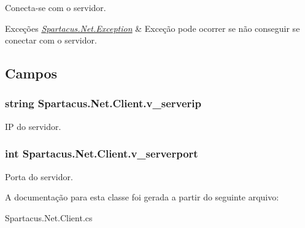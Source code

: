 Conecta-\/se com o servidor. 


\begin{DoxyExceptions}{Exceções}
{\em \hyperlink{classSpartacus_1_1Net_1_1Exception}{Spartacus.\+Net.\+Exception}} & Exceção pode ocorrer se não conseguir se conectar com o servidor.\\
\hline
\end{DoxyExceptions}


\subsection{Campos}
\hypertarget{classSpartacus_1_1Net_1_1Client_ae9fb9ee5ccfc9c3efb16681a27675ea1}{
\subsubsection[{v\+\_\+serverip}]{\setlength{\rightskip}{0pt plus 5cm}string Spartacus.\+Net.\+Client.\+v\+\_\+serverip}}\label{classSpartacus_1_1Net_1_1Client_ae9fb9ee5ccfc9c3efb16681a27675ea1}


I\+P do servidor. 

\hypertarget{classSpartacus_1_1Net_1_1Client_a70320e8d8b4e08aac5a55a636666d12c}{
\subsubsection[{v\+\_\+serverport}]{\setlength{\rightskip}{0pt plus 5cm}int Spartacus.\+Net.\+Client.\+v\+\_\+serverport}}\label{classSpartacus_1_1Net_1_1Client_a70320e8d8b4e08aac5a55a636666d12c}


Porta do servidor. 



A documentação para esta classe foi gerada a partir do seguinte arquivo\+:\begin{DoxyCompactItemize}
\item 
Spartacus.\+Net.\+Client.\+cs\end{DoxyCompactItemize}
